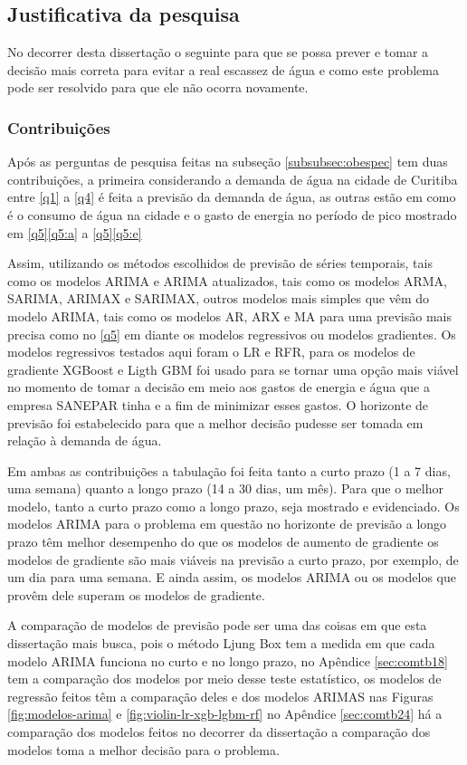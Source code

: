 \subsection{Justificativa da pesquisa} \label{subsec:justif}

No decorrer desta dissertação o seguinte para que se possa prever e tomar a decisão mais correta para evitar a real escassez de água e como este problema pode ser resolvido para que ele não ocorra novamente.

\subsubsection{Contribui\c c\~oes} \label{subsubsec:Contribuição}

Após as perguntas de pesquisa feitas na subseção \ref{subsubsec:obespec} tem duas contribuições, a primeira considerando a demanda de água na cidade de Curitiba entre \ref{q1} a \ref{q4} é feita a previsão da demanda de água, as outras estão em como é o consumo de água na cidade e o gasto de energia no período de pico mostrado em \ref{q5}\ref{q5:a} a \ref{q5}\ref{q5:e}


Assim, utilizando os métodos escolhidos de previsão de séries temporais, tais como os modelos ARIMA e ARIMA atualizados, tais como os modelos ARMA, SARIMA, ARIMAX e SARIMAX, outros modelos mais simples que vêm do modelo ARIMA, tais como os modelos AR, ARX e MA para uma previsão mais precisa como no \ref{q5} em diante os modelos regressivos ou modelos gradientes. Os modelos regressivos testados aqui foram o LR e RFR, para os modelos de gradiente XGBoost e Ligth GBM foi usado para se tornar uma opção mais viável no momento de tomar a decisão em meio aos gastos de energia e água que a empresa SANEPAR tinha e a fim de minimizar esses gastos. O horizonte de previsão foi estabelecido para que a melhor decisão pudesse ser tomada em relação à demanda de água.

Em ambas as contribuições a tabulação foi feita tanto a curto prazo (1 a 7 dias, uma semana) quanto a longo prazo (14 a 30 dias, um mês). Para que o melhor modelo, tanto a curto prazo como a longo prazo, seja mostrado e evidenciado. Os modelos ARIMA para o problema em questão no horizonte de previsão a longo prazo têm melhor desempenho do que os modelos de aumento de gradiente os modelos de gradiente são mais viáveis na previsão a curto prazo, por exemplo, de um dia para uma semana. E ainda assim, os modelos ARIMA ou os modelos que provêm dele superam os modelos de gradiente.

A comparação de modelos de previsão pode ser uma das coisas em que esta dissertação mais busca, pois o método Ljung Box tem a medida em que cada modelo ARIMA funciona no curto e no longo prazo, no Apêndice \ref{sec:comtb18} tem a comparação dos modelos por meio desse teste estatístico, os modelos de regressão feitos têm a comparação deles e dos modelos ARIMAS nas Figuras \ref{fig:modelos-arima} e \ref{fig:violin-lr-xgb-lgbm-rf} no Apêndice \ref{sec:comtb24} há a comparação dos modelos feitos no decorrer da dissertação a comparação dos modelos toma a melhor decisão para o problema.


